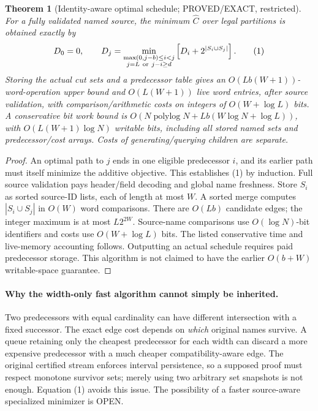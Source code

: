 \documentclass[11pt]{article}
\newtheorem{theorem}{Theorem}
\begin{document}
\begin{theorem}[Identity-aware optimal schedule; PROVED/EXACT, restricted]
For a fully validated named source, the minimum \(\widehat C\) over legal partitions is obtained exactly by
\[
 D_0=0,\qquad
 D_j=\min_{\substack{\max(0,j-b)\le i<j\\ j=L\ {\rm or}\ j-i\ge d}}
 \left[D_i+2^{|S_i\cup S_j|}\right].
 \tag{1}
\]
Storing the actual cut sets and a predecessor table gives an \(O(Lb(W+1))\)-word-operation upper bound and \(O(L(W+1))\) live word entries, after source validation, with comparison/arithmetic costs on integers of \(O(W+\log L)\) bits. A conservative bit work bound is \(O(N\operatorname{polylog}N+Lb(W\log N+\log L))\), with \(O(L(W+1)\log N)\) writable bits, including all stored named sets and predecessor/cost arrays. Costs of generating/querying children are separate.
\end{theorem}
\begin{proof}
An optimal path to \(j\) ends in one eligible predecessor \(i\), and its earlier path must itself minimize the additive objective. This establishes (1) by induction. Full source validation pays header/field decoding and global name freshness. Store \(S_i\) as sorted source-ID lists, each of length at most \(W\). A sorted merge computes \(|S_i\cup S_j|\) in \(O(W)\) word comparisons. There are \(O(Lb)\) candidate edges; the integer maximum is at most \(L2^{2W}\). Source-name comparisons use \(O(\log N)\)-bit identifiers and costs use \(O(W+\log L)\) bits. The listed conservative time and live-memory accounting follows. Outputting an actual schedule requires paid predecessor storage. This algorithm is not claimed to have the earlier \(O(b+W)\) writable-space guarantee.
\end{proof}
\paragraph{Why the width-only fast algorithm cannot simply be inherited.}
Two predecessors with equal cardinality can have different intersection with a fixed successor. The exact edge cost depends on \emph{which} original names survive. A queue retaining only the cheapest predecessor for each width can discard a more expensive predecessor with a much cheaper compatibility-aware edge. The original certified stream enforces interval persistence, so a supposed proof must respect monotone survivor sets; merely using two arbitrary set snapshots is not enough. Equation (1) avoids this issue. The possibility of a faster source-aware specialized minimizer is OPEN.
\end{document}

